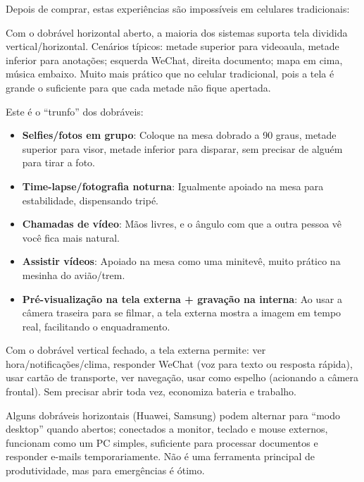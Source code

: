 
Depois de comprar, estas experiências são impossíveis em celulares tradicionais:


Com o dobrável horizontal aberto, a maioria dos sistemas suporta tela dividida vertical/horizontal. Cenários típicos: metade superior para videoaula, metade inferior para anotações; esquerda WeChat, direita documento; mapa em cima, música embaixo. Muito mais prático que no celular tradicional, pois a tela é grande o suficiente para que cada metade não fique apertada.


Este é o “trunfo” dos dobráveis:

\begin{itemize}
  \item \textbf{Selfies/fotos em grupo}: Coloque na mesa dobrado a 90 graus, metade superior para visor, metade inferior para disparar, sem precisar de alguém para tirar a foto.
  \item \textbf{Time-lapse/fotografia noturna}: Igualmente apoiado na mesa para estabilidade, dispensando tripé.
  \item \textbf{Chamadas de vídeo}: Mãos livres, e o ângulo com que a outra pessoa vê você fica mais natural.
  \item \textbf{Assistir vídeos}: Apoiado na mesa como uma minitevê, muito prático na mesinha do avião/trem.
  \item \textbf{Pré-visualização na tela externa + gravação na interna}: Ao usar a câmera traseira para se filmar, a tela externa mostra a imagem em tempo real, facilitando o enquadramento.
\end{itemize}


Com o dobrável vertical fechado, a tela externa permite: ver hora/notificações/clima, responder WeChat (voz para texto ou resposta rápida), usar cartão de transporte, ver navegação, usar como espelho (acionando a câmera frontal). Sem precisar abrir toda vez, economiza bateria e trabalho.


Alguns dobráveis horizontais (Huawei, Samsung) podem alternar para “modo desktop” quando abertos; conectados a monitor, teclado e mouse externos, funcionam como um PC simples, suficiente para processar documentos e responder e-mails temporariamente. Não é uma ferramenta principal de produtividade, mas para emergências é ótimo.

